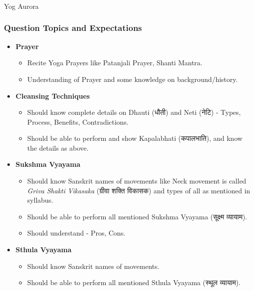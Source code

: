 \begin{frame}[fragile]\frametitle{}
\begin{center}
{\Large Yog Aurora}
\end{center}
\end{frame}

\begin{frame}[fragile]\frametitle{Question Topics and Expectations}
    \begin{itemize}
        \item \textbf{Prayer}
        \begin{itemize}
            \item Recite Yoga Prayers like Patanjali Prayer, Shanti Mantra.
            \item Understanding of Prayer and some knowledge on background/history.
        \end{itemize}
        \item \textbf{Cleansing Techniques}
        \begin{itemize}
            \item Should know complete details on Dhauti (धौती) and Neti (नेटि) - Types, Process, Benefits, Contradictions.
            \item Should be able to perform and show Kapalabhati (कपालभाति), and know the details as above.
        \end{itemize}
        \item \textbf{Sukshma Vyayama}
        \begin{itemize}
            \item Should know Sanskrit names of movements like Neck movement is called \textit{Griva Shakti Vikasaka} (ग्रीवा शक्ति विकासक) and types of all as mentioned in syllabus.
            \item Should be able to perform all mentioned Sukshma Vyayama (सूक्ष्म व्यायाम).
            \item Should understand - Pros, Cons.
        \end{itemize}
        \item \textbf{Sthula Vyayama}
        \begin{itemize}
            \item Should know Sanskrit names of movements.
            \item Should be able to perform all mentioned Sthula Vyayama (स्थूल व्यायाम).

\end{itemize}
\end{itemize}
\end{frame}
